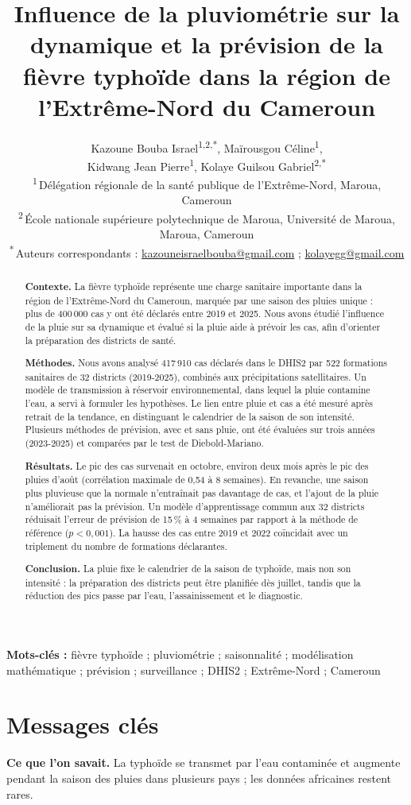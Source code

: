 \documentclass[11pt]{article}
\title{Influence de la pluviométrie sur la dynamique et la prévision de la fièvre typhoïde dans la région de l'Extrême-Nord du Cameroun}
\author{Kazoune Bouba Israel\textsuperscript{1,2,*}, Maïrousgou Céline\textsuperscript{1},\\ Kidwang Jean Pierre\textsuperscript{1}, Kolaye Guilsou Gabriel\textsuperscript{2,*}\\[1.2ex]
\small \textsuperscript{1}\,Délégation régionale de la santé publique de l'Extrême-Nord, Maroua, Cameroun\\
\small \textsuperscript{2}\,École nationale supérieure polytechnique de Maroua, Université de Maroua, Maroua, Cameroun\\
\small \textsuperscript{*}\,Auteurs correspondants : \href{mailto:kazouneisraelbouba@gmail.com}{kazouneisraelbouba@gmail.com} ; \href{mailto:kolayegg@gmail.com}{kolayegg@gmail.com}}
\date{}
\begin{document}
\sloppy
\maketitle
\begin{abstract}
\textbf{Contexte.} La fièvre typhoïde représente une charge sanitaire importante dans la région de l'Extrême-Nord du Cameroun, marquée par une saison des pluies unique : plus de 400\,000 cas y ont été déclarés entre 2019 et 2025. Nous avons étudié l'influence de la pluie sur sa dynamique et évalué si la pluie aide à prévoir les cas, afin d'orienter la préparation des districts de santé.


\textbf{Méthodes.} Nous avons analysé 417\,910 cas déclarés dans le DHIS2 par 522 formations sanitaires de 32 districts (2019-2025), combinés aux précipitations satellitaires. Un modèle de transmission à réservoir environnemental, dans lequel la pluie contamine l'eau, a servi à formuler les hypothèses. Le lien entre pluie et cas a été mesuré après retrait de la tendance, en distinguant le calendrier de la saison de son intensité. Plusieurs méthodes de prévision, avec et sans pluie, ont été évaluées sur trois années (2023-2025) et comparées par le test de Diebold-Mariano.


\textbf{Résultats.} Le pic des cas survenait en octobre, environ deux mois après le pic des pluies d'août (corrélation maximale de 0,54 à 8 semaines). En revanche, une saison plus pluvieuse que la normale n'entraînait pas davantage de cas, et l'ajout de la pluie n'améliorait pas la prévision. Un modèle d'apprentissage commun aux 32 districts réduisait l'erreur de prévision de 15\,\% à 4 semaines par rapport à la méthode de référence ($p<0{,}001$). La hausse des cas entre 2019 et 2022 coïncidait avec un triplement du nombre de formations déclarantes.


\textbf{Conclusion.} La pluie fixe le calendrier de la saison de typhoïde, mais non son intensité : la préparation des districts peut être planifiée dès juillet, tandis que la réduction des pics passe par l'eau, l'assainissement et le diagnostic.


\end{abstract}

\noindent \textbf{Mots-clés :} fièvre typhoïde ; pluviométrie ; saisonnalité ; modélisation mathématique ; prévision ; surveillance ; DHIS2 ; Extrême-Nord ; Cameroun

\section*{Messages clés}
\textbf{Ce que l'on savait.} La typhoïde se transmet par l'eau contaminée et augmente pendant la saison des pluies dans plusieurs pays ; les données africaines restent rares.
\end{document}
